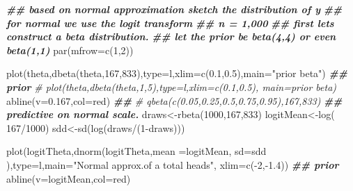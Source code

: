 \documentclass[
]{book}
\newenvironment{Shaded}{\begin{snugshade}}{\end{snugshade}}
\newcommand{\AttributeTok}[1]{\textcolor[rgb]{0.77,0.63,0.00}{#1}}
\newcommand{\CommentTok}[1]{\textcolor[rgb]{0.56,0.35,0.01}{\textit{#1}}}
\newcommand{\DecValTok}[1]{\textcolor[rgb]{0.00,0.00,0.81}{#1}}
\newcommand{\DocumentationTok}[1]{\textcolor[rgb]{0.56,0.35,0.01}{\textbf{\textit{#1}}}}
\newcommand{\FloatTok}[1]{\textcolor[rgb]{0.00,0.00,0.81}{#1}}
\newcommand{\FunctionTok}[1]{\textcolor[rgb]{0.00,0.00,0.00}{#1}}
\newcommand{\NormalTok}[1]{#1}
\newcommand{\OtherTok}[1]{\textcolor[rgb]{0.56,0.35,0.01}{#1}}
\newcommand{\SpecialCharTok}[1]{\textcolor[rgb]{0.00,0.00,0.00}{#1}}
\newcommand{\StringTok}[1]{\textcolor[rgb]{0.31,0.60,0.02}{#1}}
\theoremstyle{definition}
\theoremstyle{definition}
\theoremstyle{definition}
\theoremstyle{definition}
\theoremstyle{remark}
\begin{document}
\begin{Shaded}
\begin{Highlighting}[]
  \DocumentationTok{\#\# based on normal approximation sketch the distribution of y}
  \DocumentationTok{\#\# for normal we use the logit transform}
  \DocumentationTok{\#\# n = 1,000}
  \DocumentationTok{\#\# first lets construct a beta distribution.}
  \DocumentationTok{\#\# let the prior be beta(4,4) or even beta(1,1)}
\FunctionTok{par}\NormalTok{(}\AttributeTok{mfrow=}\FunctionTok{c}\NormalTok{(}\DecValTok{1}\NormalTok{,}\DecValTok{2}\NormalTok{))}

   \FunctionTok{plot}\NormalTok{(theta,}\FunctionTok{dbeta}\NormalTok{(theta,}\DecValTok{167}\NormalTok{,}\DecValTok{833}\NormalTok{),}\AttributeTok{type=}\StringTok{\textquotesingle{}l\textquotesingle{}}\NormalTok{,}\AttributeTok{xlim=}\FunctionTok{c}\NormalTok{(}\FloatTok{0.1}\NormalTok{,}\FloatTok{0.5}\NormalTok{),}\AttributeTok{main=}\StringTok{"prior beta"}\NormalTok{) }\DocumentationTok{\#\# prior}
  \CommentTok{\# plot(theta,dbeta(theta,1,5),type=\textquotesingle{}l\textquotesingle{},xlim=c(0.1,0.5), main=\textquotesingle{}prior beta\textquotesingle{}) }
   \FunctionTok{abline}\NormalTok{(}\AttributeTok{v=}\FloatTok{0.167}\NormalTok{,}\AttributeTok{col=}\StringTok{\textquotesingle{}red\textquotesingle{}}\NormalTok{) }\DocumentationTok{\#\# }
   \CommentTok{\#  qbeta(c(0.05,0.25,0.5,0.75,0.95),167,833)}
    \DocumentationTok{\#\# predictive on normal scale.}
\NormalTok{     draws}\OtherTok{\textless{}{-}}\FunctionTok{rbeta}\NormalTok{(}\DecValTok{1000}\NormalTok{,}\DecValTok{167}\NormalTok{,}\DecValTok{833}\NormalTok{)}
\NormalTok{     logitMean}\OtherTok{\textless{}{-}}\FunctionTok{log}\NormalTok{( }\DecValTok{167}\SpecialCharTok{/}\DecValTok{1000}\NormalTok{)}
\NormalTok{  sdd}\OtherTok{\textless{}{-}}\FunctionTok{sd}\NormalTok{(}\FunctionTok{log}\NormalTok{(draws}\SpecialCharTok{/}\NormalTok{(}\DecValTok{1}\SpecialCharTok{{-}}\NormalTok{draws)))}

   
  \FunctionTok{plot}\NormalTok{(logitTheta,}\FunctionTok{dnorm}\NormalTok{(logitTheta,}\AttributeTok{mean =}\NormalTok{logitMean, }\AttributeTok{sd=}\NormalTok{sdd ),}\AttributeTok{type=}\StringTok{\textquotesingle{}l\textquotesingle{}}\NormalTok{,}\AttributeTok{main=}\StringTok{"Normal approx.of a total heads"}\NormalTok{, }\AttributeTok{xlim=}\FunctionTok{c}\NormalTok{(}\SpecialCharTok{{-}}\DecValTok{2}\NormalTok{,}\SpecialCharTok{{-}}\FloatTok{1.4}\NormalTok{)) }\DocumentationTok{\#\# prior}
    \FunctionTok{abline}\NormalTok{(}\AttributeTok{v=}\NormalTok{logitMean,}\AttributeTok{col=}\StringTok{\textquotesingle{}red\textquotesingle{}}\NormalTok{)}
\end{Highlighting}
\end{Shaded}
\end{document}
